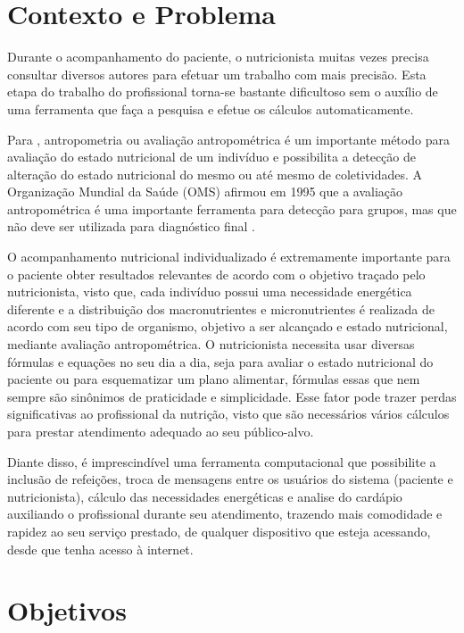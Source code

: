 \section{Contexto e Problema}

Durante o acompanhamento do paciente, o nutricionista muitas vezes precisa
consultar diversos autores para efetuar um trabalho com mais precisão. Esta etapa do trabalho do profissional
torna-se bastante dificultoso sem o auxílio de uma ferramenta que faça a pesquisa e efetue os cálculos automaticamente.

Para , antropometria ou avaliação antropométrica é um importante método para avaliação do estado nutricional de um indivíduo e possibilita a detecção de alteração do estado nutricional do mesmo ou até mesmo de coletividades. A Organização Mundial da Saúde (OMS) afirmou em 1995 que a avaliação antropométrica é uma importante ferramenta para detecção para grupos, mas que não deve ser utilizada para diagnóstico final \cite{oms}.

O acompanhamento nutricional individualizado é extremamente importante para
o paciente obter resultados relevantes de acordo com o objetivo traçado pelo
nutricionista, visto que, cada indivíduo possui uma necessidade energética diferente
e a distribuição dos macronutrientes e micronutrientes é realizada de acordo com seu
tipo de organismo, objetivo a ser alcançado e estado nutricional, mediante avaliação
antropométrica.
O nutricionista necessita usar diversas fórmulas
e equações no seu dia a dia, seja para avaliar o estado nutricional do
paciente ou para esquematizar um plano alimentar, fórmulas essas que nem sempre
são sinônimos de praticidade e simplicidade. Esse fator pode trazer perdas
significativas ao profissional da nutrição, visto que são necessários vários cálculos
para prestar atendimento adequado ao seu público-alvo.

Diante disso, é imprescindível uma ferramenta computacional que possibilite a inclusão de refeições, troca de mensagens entre
os usuários do sistema (paciente e nutricionista), 
cálculo das necessidades energéticas e analise do
cardápio auxiliando o profissional durante seu atendimento, trazendo mais
comodidade e rapidez ao seu serviço prestado, de qualquer dispositivo que esteja acessando, desde
que tenha acesso à internet.

\section{Objetivos}

